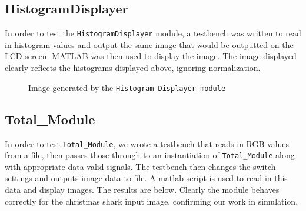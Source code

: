 \documentclass[12pt]{article}
\begin{document}
  \subsection{HistogramDisplayer}
  In order to test the \texttt{HistogramDisplayer} module, a testbench was written to read in histogram values and output the same image that would be outputted on the LCD screen. MATLAB was then used to display the image. The image displayed clearly reflects the histograms displayed above, ignoring normalization.
  \begin{figure}[H]
    \caption{Image generated by the \texttt{Histogram Displayer module}}
    \label{fig:histogram_displayer_testbench}
  \end{figure} 
  
\newpage
  \subsection{Total\_Module}
  In order to test \texttt{Total\_Module}, we wrote a testbench that reads in RGB values from a file, then passes those through to an instantiation of \texttt{Total\_Module} along with appropriate data valid signals. The testbench then changes the switch settings and outputs image data to file. A matlab script is used to read in this data and display images. The results are below. Clearly the module behaves correctly for the christmas shark input image, confirming our work in simulation.
\end{document}
